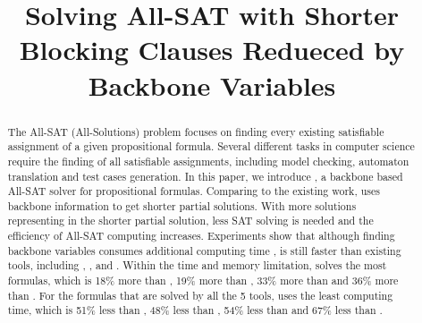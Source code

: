 \documentclass{article}
\begin{document}
\title{Solving All-SAT with Shorter Blocking Clauses Redueced by Backbone Variables}
\maketitle
\begin{abstract}
The All-SAT (All-Solutions) problem focuses on finding every existing satisfiable assignment of a given propositional formula. Several different tasks in computer science require the finding of all satisfiable assignments, including model checking, automaton translation and test cases generation.
In this paper, we introduce \tool, a backbone based All-SAT solver for propositional formulas. Comparing to the existing work, \tool uses backbone information to get shorter partial solutions. With more solutions representing in the shorter partial solution, less SAT solving is needed and the efficiency of All-SAT computing increases.
Experiments show that although finding backbone variables consumes additional computing time , \tool is still faster than existing tools, including \ctool, \bc, \nbc and \bdd.
Within the time and memory limitation, \tool solves the most formulas, which is 18\% more than \ctool, 19\% more than \bc, 33\% more than \nbc and 36\% more than \bdd.
For the formulas that are solved by all the 5 tools, \tool uses the least computing time, which is 51\% less than \ctool, 48\% less than \bc, 54\% less than \nbc and 67\% less than \bdd.
\end{abstract}








\end{document}
